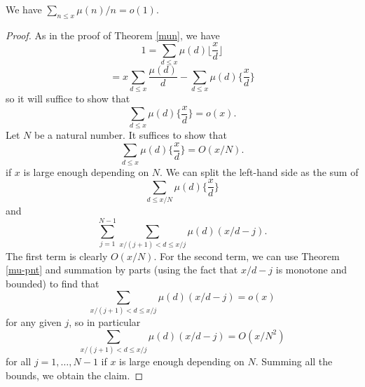 \begin{proposition}
\label{mu-pnt-alt}
\leanok
We have $\sum_{n \leq x} \mu(n)/n = o(1)$.
\end{proposition}
\begin{proof}
\leanok
As in the proof of Theorem \ref{mun}, we have
    $$ 1 = \sum_{d \leq x} \mu(d) \lfloor \frac{x}{d} \rfloor$$
    $$ = x \sum_{d \leq x} \frac{\mu(d)}{d} - \sum_{d \leq x} \mu(d) \{ \frac{x}{d} \}$$
  so it will suffice to show that
  $$ \sum_{d \leq x} \mu(d) \{ \frac{x}{d} \} = o(x).$$
  Let $N$  be a natural number.  It suffices to show that
  $$ \sum_{d \leq x} \mu(d) \{ \frac{x}{d} \} = O(x/N).$$
  if $x$ is large enough depending on $N$.
  We can split the left-hand side as the sum of
  $$ \sum_{d \leq x/N} \mu(d) \{ \frac{x}{d} \} $$
  and
  $$ \sum_{j=1}^{N-1} \sum_{x/(j+1) < d \leq x/j} \mu(d) (x/d - j).$$
  The first term is clearly $O(x/N)$.  For the second term, we can use Theorem \ref{mu-pnt}
  and summation by parts (using the fact that $x/d-j$ is monotone and bounded) to find that
  $$ \sum_{x/(j+1) < d \leq x/j} \mu(d) (x/d - j) = o(x)$$
  for any given $j$, so in particular
  $$ \sum_{x/(j+1) < d \leq x/j} \mu(d) (x/d - j) = O(x/N^2)$$
  for all $j=1,\dots,N-1$ if $x$ is large enough depending on $N$.
  Summing all the bounds, we obtain the claim.
\end{proof}
